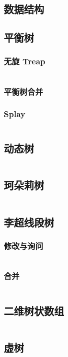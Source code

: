 \documentclass[12pt, a4paper, oneside]{ctexart}
\begin{document}
\begin{multicols}{2}
        \section{数据结构}
        \subsection{平衡树}
        \subsubsection{无旋 Treap}
        \inputminted{cpp}{src/data structure/fhq.cpp}
        \subsubsection{平衡树合并}
        
        \subsubsection{Splay}
        \inputminted{cpp}{src/data structure/splay.cpp}
        \subsection{动态树}
        \inputminted{cpp}{src/data structure/LCT.cpp}
        \subsection{珂朵莉树}
        \inputminted{cpp}{src/data structure/ODT.cpp}
        \subsection{李超线段树}
        \subsubsection{修改与询问}
        \inputminted{cpp}{src/data structure/lichao.cpp}
        \subsubsection{合并}
        \inputminted{cpp}{src/data structure/lichao-merge.cpp}
        \subsection{二维树状数组}
        \inputminted{cpp}{src/data structure/2D-BIT.cpp}
        \subsection{虚树}
        \inputminted{cpp}{src/data structure/virtual-tree.cpp}

\end{multicols}
\end{document}
